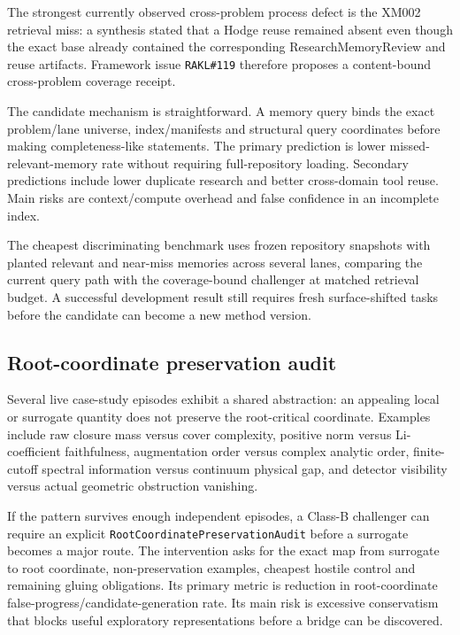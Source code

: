 The strongest currently observed cross-problem process defect is the XM002 retrieval miss: a synthesis stated that a Hodge reuse remained absent even though the exact base already contained the corresponding ResearchMemoryReview and reuse artifacts. Framework issue \texttt{RAKL\#119} therefore proposes a content-bound cross-problem coverage receipt.

The candidate mechanism is straightforward. A memory query binds the exact problem/lane universe, index/manifests and structural query coordinates before making completeness-like statements. The primary prediction is lower missed-relevant-memory rate without requiring full-repository loading. Secondary predictions include lower duplicate research and better cross-domain tool reuse. Main risks are context/compute overhead and false confidence in an incomplete index.

The cheapest discriminating benchmark uses frozen repository snapshots with planted relevant and near-miss memories across several lanes, comparing the current query path with the coverage-bound challenger at matched retrieval budget. A successful development result still requires fresh surface-shifted tasks before the candidate can become a new method version.

\subsection{Root-coordinate preservation audit}

Several live case-study episodes exhibit a shared abstraction: an appealing local or surrogate quantity does not preserve the root-critical coordinate. Examples include raw closure mass versus cover complexity, positive norm versus Li-coefficient faithfulness, augmentation order versus complex analytic order, finite-cutoff spectral information versus continuum physical gap, and detector visibility versus actual geometric obstruction vanishing.

If the pattern survives enough independent episodes, a Class-B challenger can require an explicit \texttt{RootCoordinatePreservationAudit} before a surrogate becomes a major route. The intervention asks for the exact map from surrogate to root coordinate, non-preservation examples, cheapest hostile control and remaining gluing obligations. Its primary metric is reduction in root-coordinate false-progress/candidate-generation rate. Its main risk is excessive conservatism that blocks useful exploratory representations before a bridge can be discovered.

